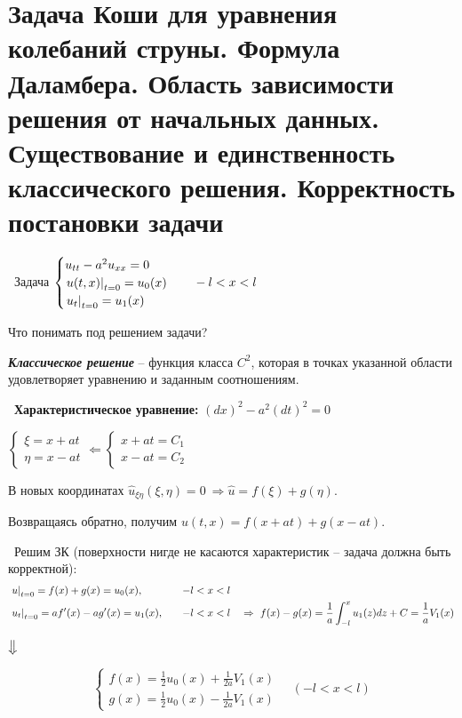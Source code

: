 \documentclass[../main.tex]{subfiles}
\begin{document}
  
\section{Задача Коши для уравнения колебаний струны. Формула Даламбера. Область зависимости решения от начальных данных. Существование и единственность классического решения. Корректность постановки задачи}
\textbullet\ Задача $\begin{cases} u_{tt}-a^2u_{xx} = 0\\ \left. u(t,x)\right|_{t=0} = u_0(x)\\ \left. u_t\right|_{t=0} = u_1(x)\end{cases}\quad -l<x<l$

Что понимать под решением задачи?

\begin{definition} \textbf{\emph{Классическое решение}} -- функция класса $C^2$, которая в точках указанной области удовлетворяет уравнению и заданным соотношениям.
\end{definition}

\textbullet\ {\bf Характеристическое уравнение: } $(dx)^2 - a^2(dt)^2 = 0$

$\begin{cases} \xi = x+at \\ \eta = x-at \end{cases} \Leftarrow \begin{cases} x+at = C_1 \\ x-at = C_2 \end{cases}$

В новых координатах $\hat{u}_{\xi\eta}(\xi,\eta) = 0\ \Rightarrow \hat{u} = f(\xi) + g(\eta) $.

Возвращаясь обратно, получим $u(t,x) = f(x+at) + g(x-at)$.
\vspace{0.4em}

\textbullet\ Решим ЗК (поверхности нигде не касаются характеристик -- задача должна быть корректной):
\begin{equation*}
\begin{aligned}
&\left. u\right|_{t=0} = f(x) + g(x) = u_0(x), \quad &-l < x< l&\\
&\left. u_t\right|_{t=0} =  af'(x) - ag'(x) = u_1(x), \quad &-l < x < l& \quad \Rightarrow\ f(x) - g(x) = \frac1{a}\int _{-l}^xu_1(z)dz + C = \frac1{a}V_1(x)
\end{aligned}
\end{equation*}
\begin{center}
$\big\Downarrow$
\end{center}
\begin{equation}
\label{eq::3::dalam}
\tag{*}
\begin{cases} f(x) = \frac1{2}u_0(x) + \frac1{2a}V_1(x) \\ g(x) = \frac1{2}u_0(x) - \frac1{2a}V_1(x) \end{cases} \quad (-l < x< l)
\end{equation}
\end{document}
